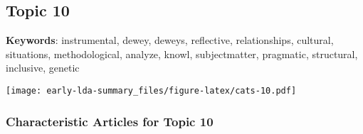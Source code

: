 \documentclass[
]{article}
\begin{document}
\newpage

\hypertarget{topic-10}{%
\subsection{Topic 10}\label{topic-10}}

\textbf{Keywords}: instrumental, dewey, deweys, reflective,
relationships, cultural, situations, methodological, analyze, knowl,
subjectmatter, pragmatic, structural, inclusive, genetic

\texttt{[image: early-lda-summary\_files/figure-latex/cats-10.pdf]}
\newpage 

\hypertarget{characteristic-articles-for-topic-10}{%
\subsubsection{Characteristic Articles for Topic
10}\label{characteristic-articles-for-topic-10}}
\end{document}
